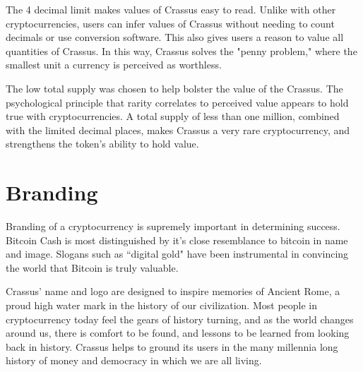 \documentclass[12pt]{article}
\begin{document}
The 4 decimal limit makes values of Crassus easy to read.  Unlike with other cryptocurrencies, users can infer values of Crassus without needing to count decimals or use conversion software.  This also gives users a reason to value all quantities of Crassus.  In this way, Crassus solves the "penny problem," where the smallest unit a currency is perceived as worthless.

The low total supply was chosen to help bolster the value of the Crassus.  The psychological principle that rarity correlates to perceived value appears to hold true with cryptocurrencies.  A total supply of less than one million, combined with the limited decimal places, makes Crassus a very rare cryptocurrency, and strengthens the token's ability to hold value.


\section{Branding}\label{Branding}
Branding of a cryptocurrency is supremely important in determining success.  Bitcoin Cash is most distinguished by it's close resemblance to bitcoin in name and image.  Slogans such as ``digital gold" have been instrumental in convincing the world that Bitcoin is truly valuable.

Crassus' name and logo are designed to inspire memories of Ancient Rome, a proud high water mark in the history of our civilization.  Most people in cryptocurrency today feel the gears of history turning, and as the world changes around us, there is comfort to be found, and lessons to be learned from looking back in history.  Crassus helps to ground its users in the many millennia long history of money and democracy in which we are all living.



\end{document}
